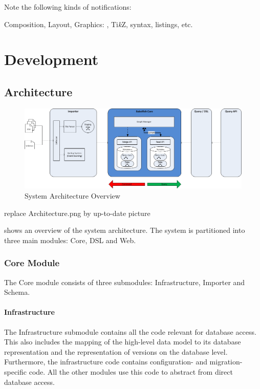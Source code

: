 Note the following kinds of notifications:


Composition, Layout, Graphics: \XeLaTeX{}, Ti\emph{k}Z, syntax, listings, etc.

\mainmatter

\chapter{Development}
\section{Architecture}
\begin{figure}[htbp]
\centering
\includegraphics[width=\textwidth]{./graphics/Architecture}
\caption{System Architecture Overview}
\label{fig:Architecture}
\end{figure}
\todo replace Architecture.png by up-to-date picture


 shows an overview of the system architecture. The system is partitioned into three main modules: Core, DSL and Web.

\subsection{Core Module}
The Core module consists of three submodules: Infrastructure, Importer and Schema.

\subsubsection{Infrastructure}
The Infrastructure submodule contains all the code relevant for database access.
This also includes the mapping of the high-level data model to its database representation and the representation of versions on the database level.
Furthermore, the infrastructure code contains configuration- and migration-specific code.
All the other modules use this code to abstract from direct database access.
